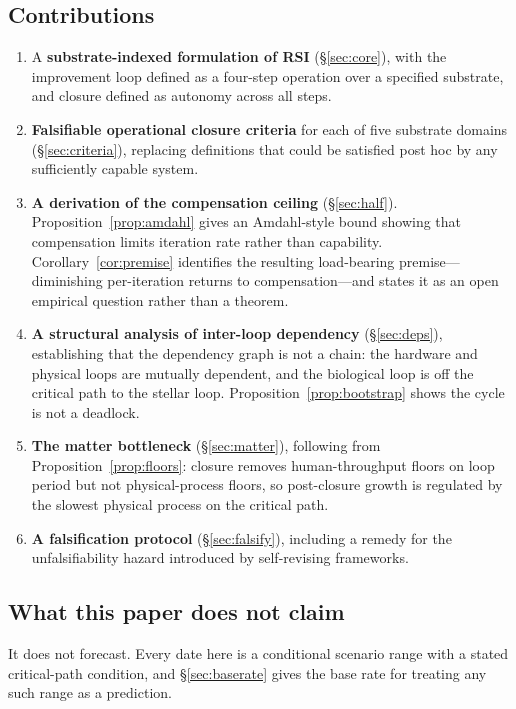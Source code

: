 \documentclass[11pt]{article}
\begin{document}
\subsection{Contributions}

\begin{enumerate}
\item A \textbf{substrate-indexed formulation of RSI} (\S\ref{sec:core}), with the improvement loop defined as a four-step operation over a specified substrate, and closure defined as autonomy across all steps.
\item \textbf{Falsifiable operational closure criteria} for each of five substrate domains (\S\ref{sec:criteria}), replacing definitions that could be satisfied post hoc by any sufficiently capable system.
\item \textbf{A derivation of the compensation ceiling} (\S\ref{sec:half}). Proposition~\ref{prop:amdahl} gives an Amdahl-style bound showing that compensation limits iteration rate rather than capability. Corollary~\ref{cor:premise} identifies the resulting load-bearing premise---diminishing per-iteration returns to compensation---and states it as an open empirical question rather than a theorem.
\item \textbf{A structural analysis of inter-loop dependency} (\S\ref{sec:deps}), establishing that the dependency graph is not a chain: the hardware and physical loops are mutually dependent, and the biological loop is off the critical path to the stellar loop. Proposition~\ref{prop:bootstrap} shows the cycle is not a deadlock.
\item \textbf{The matter bottleneck} (\S\ref{sec:matter}), following from Proposition~\ref{prop:floors}: closure removes human-throughput floors on loop period but not physical-process floors, so post-closure growth is regulated by the slowest physical process on the critical path.
\item \textbf{A falsification protocol} (\S\ref{sec:falsify}), including a remedy for the unfalsifiability hazard introduced by self-revising frameworks.
\end{enumerate}

\subsection{What this paper does not claim}

It does not forecast. Every date here is a conditional scenario range with a stated critical-path condition, and \S\ref{sec:baserate} gives the base rate for treating any such range as a prediction.
\end{document}
